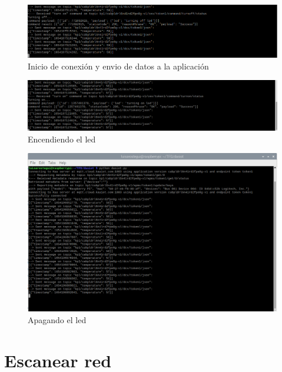 {\begin{figure}[p]
    \centering
    \includegraphics[width=\linewidth]{imagenes/2022-06-01-201846_1920x1080_scrot.png}
    \caption{Inicio de conexión y envio de datos a la aplicación}
    \label{fig:figure16}
\end{figure}

\begin{figure}[p]
    \centering
    \includegraphics[width=\linewidth]{imagenes/2022-06-01-201209_1920x1080_scrot.png}
    \caption{Encendiendo el led}
    \label{fig:figure17}
\end{figure}

\begin{figure}[p]
    \centering
    \includegraphics[width=\linewidth]{imagenes/2022-06-01-200813_1920x1080_scrot.png}
    \caption{Apagando el led}
    \label{fig:figure18}
\end{figure}

\newpage

\section{Escanear red}

}
